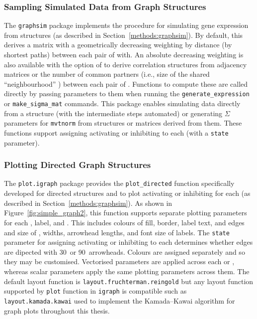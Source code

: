 \subsubsection{Sampling Simulated Data from Graph Structures}
The \texttt{graphsim} package implements the procedure for simulating \gls{gene expression} from  structures (as described in Section~\ref{methods:graphsim}). By default, this derives a matrix with a geometrically decreasing weighting by distance (by \glspl{shortest path}) between each pair of  with. An absolute decreasing weighting is also available with the option of to derive correlation structures from adjacency matrices or the number of  common partners (i.e., size of the shared ``neighbourhood'' \citep{Hell1976}) between each pair of . Functions to compute these are called directly by passing parameters to them when running the \texttt{generate\_expression} or \texttt{make\_sigma\_mat} commands. This package enables simulating  data directly from a  structure (with the intermediate steps automated) or generating $\Sigma$ parameters for \texttt{mvtnorm} from  structures or matrices derived from them. These functions support assigning activating or inhibiting to each  (with a \texttt{state} parameter).

\subsubsection{Plotting Directed Graph Structures}
The \texttt{plot.igraph} package provides the \texttt{plot\_directed} function specifically developed for directed  structures and to plot activating or inhibiting for each  (as described in Section~\ref{methods:graphsim}). As shown in Figure~\ref{fig:simple_graph2}, this function supports separate plotting parameters for each ,  label, and . This includes colours of  fill, border, label text, and \glspl{edge} and size of ,  widths, arrowhead lengths, and font size of labels. The  \texttt{state} parameter for assigning activating or inhibiting to each  determines whether \glspl{edge} are dipected with 30\textdegree\ or 90\textdegree\ arrowheads. Colours are assigned separately and so they may be customised. Vectorised parameters are applied across each  or , whereas scalar parameters apply the same plotting parameters across them. The default layout function is \texttt{layout.fruchterman.reingold} but any layout function supported by \texttt{plot} function in \texttt{igraph} \citep{igraph} is compatible such as \texttt{layout.kamada.kawai} used to implement the Kamada--Kawai algorithm \citep{Kamada1989} for graph plots throughout this thesis.
 

